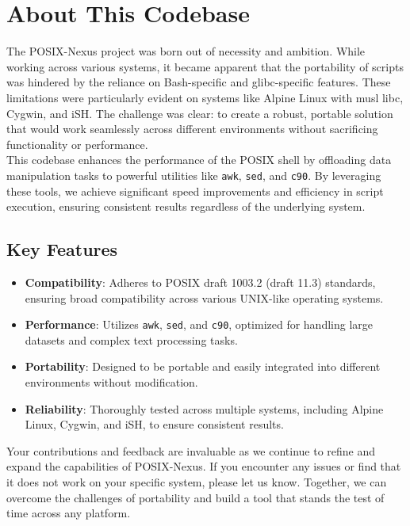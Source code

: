 \section{About This Codebase}

The POSIX-Nexus project was born out of necessity and ambition. While working across various systems, it became apparent that the portability of scripts was hindered by the reliance on Bash-specific and glibc-specific features. These limitations were particularly evident on systems like Alpine Linux with musl libc, Cygwin, and iSH. The challenge was clear: to create a robust, portable solution that would work seamlessly across different environments without sacrificing functionality or performance.
\\

This codebase enhances the performance of the POSIX shell by offloading data manipulation tasks to powerful utilities like \texttt{awk}, \texttt{sed}, and \texttt{c90}. By leveraging these tools, we achieve significant speed improvements and efficiency in script execution, ensuring consistent results regardless of the underlying system.

\subsection{Key Features}
\begin{itemize}
    \item \textbf{Compatibility}: Adheres to POSIX draft 1003.2 (draft 11.3) standards, ensuring broad compatibility across various UNIX-like operating systems.
    \item \textbf{Performance}: Utilizes \texttt{awk}, \texttt{sed}, and \texttt{c90}, optimized for handling large datasets and complex text processing tasks.
    \item \textbf{Portability}: Designed to be portable and easily integrated into different environments without modification.
    \item \textbf{Reliability}: Thoroughly tested across multiple systems, including Alpine Linux, Cygwin, and iSH, to ensure consistent results.
\end{itemize}

Your contributions and feedback are invaluable as we continue to refine and expand the capabilities of POSIX-Nexus. If you encounter any issues or find that it does not work on your specific system, please let us know. Together, we can overcome the challenges of portability and build a tool that stands the test of time across any platform.
\newpage